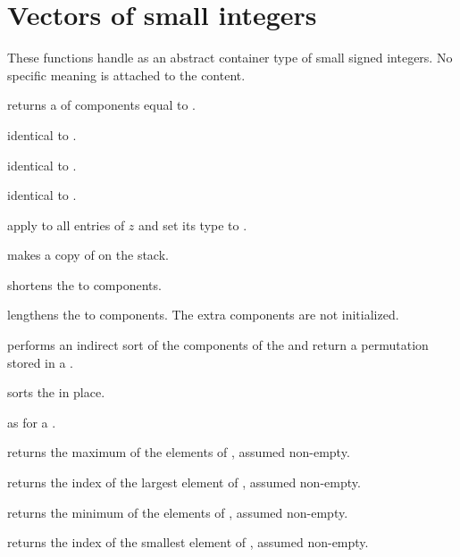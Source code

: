 \section{Vectors of small integers}


These functions handle  as an abstract container type
of small signed integers. No specific meaning is attached to the content.

 returns a 
of  components equal to .

 identical to .

 identical to .

 identical to .

 apply  to all entries
of $z$ and set its type to .

 makes a copy of  on the stack.

 shortens the  
to  components.

 lengthens the 
 to  components. The extra components are not initialized.

 performs an indirect sort of the
components of the   and return a permutation stored in a
.

 sorts the   in place.

 as  for a 
.

 returns the maximum of the elements of
 , assumed non-empty.

 returns the index of the largest
element of  , assumed non-empty.

 returns the minimum of the elements of
 , assumed non-empty.

 returns the index of the smallest
element of  , assumed non-empty.

